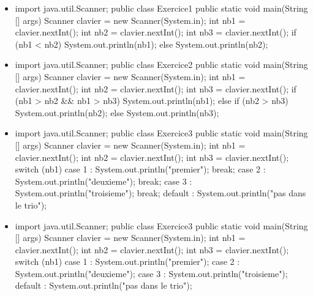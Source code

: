 \documentclass[11pt,a4paper]{article}
\begin{document}
\begin{itemize}
			\item \begin{Java}
import java.util.Scanner;
public class Exercice1 {
    public static void main(String [] args) {
        Scanner clavier = new Scanner(System.in);
        int nb1 = clavier.nextInt();
        int nb2 = clavier.nextInt();
        int nb3 = clavier.nextInt();
        if (nb1 < nb2){
          System.out.println(nb1);
        } else {
          System.out.println(nb2);
        } 
    }
}
        \end{Java} \textcolor{gray}{\underline{\hspace*{1em}}} 
			\item \begin{Java}
import java.util.Scanner;
public class Exercice2 {
    public static void main(String [] args) {
        Scanner clavier = new Scanner(System.in);
        int nb1 = clavier.nextInt();
        int nb2 = clavier.nextInt();
        int nb3 = clavier.nextInt();
        if (nb1 > nb2 && nb1 > nb3){
          System.out.println(nb1);
        } else {
            if (nb2 > nb3){
              System.out.println(nb2);
            } else {
              System.out.println(nb3);
            }
        } 
    }
}
        \end{Java} \textcolor{gray}{\underline{\hspace*{1em}}} 
			\item \begin{Java}
import java.util.Scanner;
public class Exercice3 {
    public static void main(String [] args) {
        Scanner clavier = new Scanner(System.in);
        int nb1 = clavier.nextInt();
        int nb2 = clavier.nextInt();
        int nb3 = clavier.nextInt();
        switch (nb1){
          case 1 : System.out.println("premier"); break;
          case 2 : System.out.println("deuxieme"); break;
          case 3 : System.out.println("troisieme"); break;
          default : System.out.println("pas dans le trio");
        } 
    }
}
        \end{Java} \textcolor{gray}{\underline{\hspace*{10em}}} 
			\item \begin{Java}
import java.util.Scanner;
public class Exercice3 {
    public static void main(String [] args) {
        Scanner clavier = new Scanner(System.in);
        int nb1 = clavier.nextInt();
        int nb2 = clavier.nextInt();
        int nb3 = clavier.nextInt();
        switch (nb1){
          case 1 : System.out.println("premier");
          case 2 : System.out.println("deuxieme");
          case 3 : System.out.println("troisieme");
          default : System.out.println("pas dans le trio");
        } 
    }
}
        \end{Java} \textcolor{gray}{\underline{\hspace*{20em}}} 
					\end{itemize}
				
\end{document}
